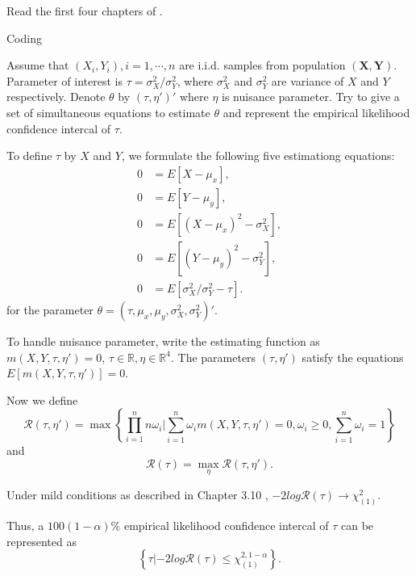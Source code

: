 
\begin{problem}
    Read the first four chapters of \citet{Owen2001}.
\end{problem}

\begin{problem}
    Coding
\end{problem}

\begin{problem}
    Assume that $(X_i,Y_i), i=1,\cdots,n$ are  i.i.d. samples from population $(\mathbf{X},\mathbf{Y})$. Parameter of interest is $\tau=\sigma^2_X / \sigma^2_Y$, where  $\sigma^2_X$ and $\sigma^2_Y$ are variance of $X$ and $Y$ respectively. Denote $\theta$ by $(\tau,\eta')'$ where $\eta$ is nuisance parameter. Try to give a set of simultaneous equations to estimate $\theta$ and represent the empirical likelihood confidence intercal of $\tau$.
\end{problem}

\begin{solution}
    To define $\tau$ by $X$ and $Y$, we formulate the following five estimationg equations:
    \begin{equation*}
        \begin{split}
            0 & = E[X-\mu_x], \\
            0 & = E[Y-\mu_y], \\
            0 & = E[(X-\mu_x)^2 - \sigma^2_X], \\
            0 & = E[(Y-\mu_y)^2 - \sigma^2_Y],\\
            0 & = E[\sigma^2_X / \sigma^2_Y - \tau].
        \end{split}
    \end{equation*}
    for the parameter $\theta=(\tau,\mu_x,\mu_y,\sigma^2_X, \sigma^2_Y)'$.

    To handle nuisance parameter, write the estimating function as $m(X,Y,\tau,\eta')=0$, $\tau\in \mathbb{R}, \eta\in \mathbb{R}^4$.
    The parameters $(\tau,\eta')$ satisfy the equations $E[m(X,Y,\tau,\eta')]=0$.

    Now we define 
    \begin{equation*}
        \mathcal{R}(\tau,\eta') = \max \left\{ \prod_{i=1}^n n\omega_i | \sum_{i=1}^n \omega_i m(X,Y,\tau,\eta') =0, \omega_i\ge 0, \sum_{i=1}^n \omega_i=1 \right\}
    \end{equation*}
    and
    \begin{equation*}
        \mathcal{R}(\tau) = \max_{\eta} \mathcal{R}(\tau,\eta') .
    \end{equation*}

    Under mild conditions as described in Chapter 3.10 \citep{Owen2001}, $-2log  \mathcal{R}(\tau) \to \chi^2_{(1)}$.

    Thus, a $100(1-\alpha)\%$ empirical likelihood confidence intercal of $\tau$ can be represented as 
    \begin{equation*}
        \left\{ \tau |  -2log \mathcal{R}(\tau) \le \chi^{2,1-\alpha}_{(1)}\right\}.
    \end{equation*}
\end{solution}
